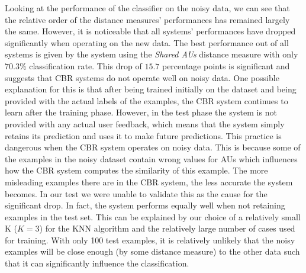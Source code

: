 \documentclass[10pt,a4paper]{article}
\begin{document}
Looking at the performance of the classifier on the noisy data, we can see that the relative order of the distance measures' performances has remained largely the same. However, it is noticeable that all systems' performances have dropped significantly when operating on the new data. The best performance out of all systems is given by the system using the \emph{Shared AUs} distance measure with only $70.3\%$ classification rate. This drop of $15.7$ percentage points is significant and suggests that CBR systems do not operate well on noisy data.
One possible explanation for this is that after being trained initially on the dataset and being provided with the actual labels of the examples, the CBR system continues to learn after the training phase. However, in the test phase the system is not provided with any actual user feedback, which means that the system simply retains its prediction and uses it to make future predictions. This practice is dangerous when the CBR system operates on noisy data. This is because some of the examples in the noisy dataset contain wrong values for AUs which influences how the CBR system computes the similarity of this example. The more misleading examples there are in the CBR system, the less accurate the system becomes. In our test we were unable to validate this as the cause for the significant drop. In fact, the system performs equally well when not retaining examples in the test set. This can be explained by our choice of a relatively small K ($K=3$) for the KNN algorithm and the relatively large number of cases used for training. With only 100 test examples, it is relatively unlikely that the noisy examples will be close enough (by some distance measure) to the other data such that it can significantly influence the classification.
\end{document}
